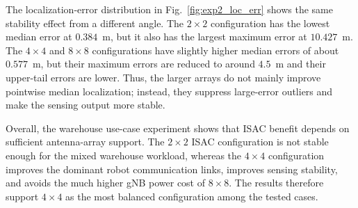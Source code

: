 The localization-error distribution in Fig.~\ref{fig:exp2_loc_err} shows the
same stability effect from a different angle. The $2\!\times\!2$ configuration
has the lowest median error at $0.384$~m, but it also has the largest maximum
error at $10.427$~m. The $4\!\times\!4$ and $8\!\times\!8$ configurations have
slightly higher median errors of about $0.577$~m, but their maximum errors are
reduced to around $4.5$~m and their upper-tail errors are lower. Thus, the
larger arrays do not mainly improve pointwise median localization; instead,
they suppress large-error outliers and make the sensing output more stable.

Overall, the warehouse use-case experiment shows that ISAC benefit depends on
sufficient antenna-array support. The $2\!\times\!2$ ISAC configuration is not
stable enough for the mixed warehouse workload, whereas the $4\!\times\!4$
configuration improves the dominant robot communication links, improves sensing
stability, and avoids the much higher gNB power cost of $8\!\times\!8$. The
results therefore support $4\!\times\!4$ as the most balanced configuration
among the tested cases.
